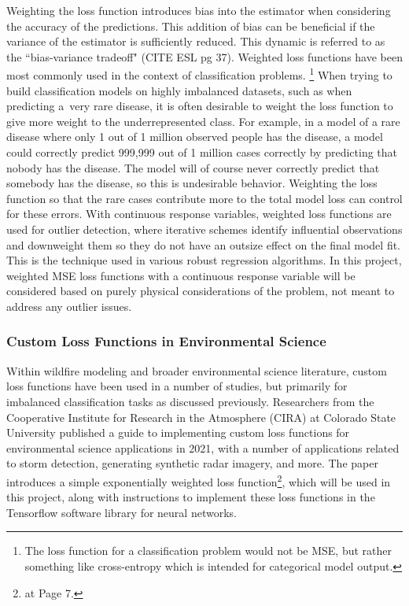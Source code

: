 \documentclass[11pt]{article}%
\begin{document}
Weighting the loss function introduces bias into the estimator when considering the accuracy of the predictions. This addition of bias can be beneficial if the variance of the estimator is sufficiently reduced. This dynamic is referred to as the ``bias-variance tradeoff" (CITE ESL pg 37). Weighted loss functions have been most commonly used in the context of classification problems. \footnote{The loss function for a classification problem would not be MSE, but rather something like cross-entropy which is intended for categorical model output.} When trying to build classification models on highly imbalanced datasets, such as when predicting a~very rare disease, it is often desirable to weight the loss function to give more weight to the underrepresented class. For example, in a model of a rare disease where only 1 out of 1 million observed people has the disease, a model could correctly predict 999,999 out of 1 million cases correctly by predicting that nobody has the disease. The model will of course never correctly predict that somebody has the disease, so this is undesirable behavior. Weighting the loss function so that the rare cases contribute more to the total model loss can control for these errors. With continuous response variables, weighted loss functions are used for outlier detection, where iterative schemes identify influential observations and downweight them so they do not have an outsize effect on the final model fit. This is the technique used in various robust regression algorithms.\cite{OLeary-1990-RRC} In this project, weighted MSE loss functions with a continuous response variable will be considered based on purely physical considerations of the problem, not meant to address any outlier issues. 

\subsubsection{Custom Loss Functions in Environmental Science}

Within wildfire modeling and broader environmental science literature, custom loss functions have been used in a number of studies, but primarily for imbalanced classification tasks as discussed previously. Researchers from the Cooperative Institute for Research in the Atmosphere (CIRA) at Colorado State University published a guide to implementing custom loss functions for environmental science applications in 2021, with a number of applications related to storm detection, generating synthetic radar imagery, and more. \cite{Ebert-2021-GCL} The paper introduces a simple exponentially weighted loss function\footnote{\cite{Ebert-2021-GCL} at Page 7.}, which will be used in this project, along with instructions to implement these loss functions in the Tensorflow software library for neural networks.
\end{document}

